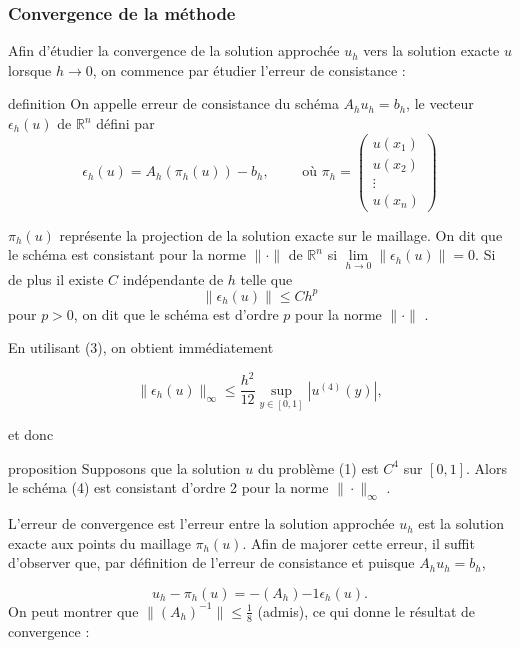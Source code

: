 \documentclass{beamer}
\begin{document}
  \begin{frame} 
  \frametitle{Convergence de la méthode}
Afin d'étudier la convergence de la solution approchée $u_h$ vers la solution exacte $u$ lorsque $h \to 0$, on commence par étudier l'erreur de consistance :
 \begin{block}{definition}
On appelle erreur de consistance du schéma  $A_h u_h = b_h$, le vecteur $\epsilon_h(u)$ de $\mathbb{R}^n$ défini par
\[\epsilon_h(u) = A_h(\pi_h(u)) - b_h, \qquad \mbox{ où } 
\pi_h= \left(\begin{array}{c}
u(x_1)\\u(x_2)\\ \vdots \\ u(x_{n}) 
\end{array}\right)\]

$\pi_h(u)$ représente la projection de la solution exacte sur le maillage. On dit que le schéma est consistant pour la norme $\|\cdot \|$ de $\mathbb{R}^n$ si $\lim\limits_{h\to 0} \|\epsilon_h(u) \| = 0$. Si de plus il existe $C$ indépendante de $h$ telle que
\[\|\epsilon_h(u) \| \leqslant  C h^p\]
pour $p>0$, on dit que le schéma est d'ordre $p$ pour la norme $\|\cdot \|$ .
\end{block}

  \end{frame} 
   \begin{frame} 
 En utilisant (3), on obtient immédiatement
 
\[    \| \epsilon_h(u)  \|_{\infty}  \leq  \frac{h^2}{12} \sup_{y\in[0,1]} |u^{(4)}(y)|, \]

 et donc
 \begin{block}{proposition}
 Supposons que la solution $u$ du problème (1) est $C^4$  sur $[0, 1]$. Alors le schéma (4) est consistant d'ordre 2 pour la norme $\|\cdot \|_{\infty}$ .
 \end{block}


L'erreur de convergence est l'erreur entre la solution approchée $u_h$ est la solution exacte aux points du maillage $\pi_h(u)$. Afin de majorer cette erreur, il suffit d'observer que, par définition de l'erreur de consistance et puisque $A_h u_h = b_h$,

\[u_h - \pi_h(u) = -(A_h){-1}\epsilon_h(u).\]
On peut montrer que $\|(A_h)^{-1}\|\leq \frac{1}{8}$ (admis), ce qui donne le résultat de convergence :

    \end{frame} 
\end{document}

